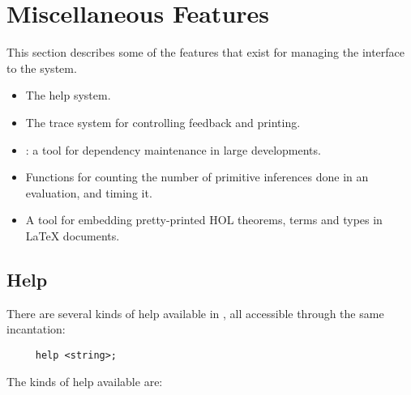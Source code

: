 \chapter{Miscellaneous Features}\label{avramisc}

This section describes some of the features
that exist for managing the interface
%
%
to the \HOL{} system.

\begin{itemize}
\item The help system.
\item The trace system for controlling feedback and printing.
\item \holmake{}: a tool for dependency maintenance in large developments.
\item Functions for counting the number of primitive inferences done in
an evaluation, and timing it.
\item A tool for embedding pretty-printed HOL theorems, terms and
  types in \LaTeX{} documents.
\end{itemize}

\section{Help}

 There are several kinds of help available in \HOL{}, all accessible
 through the same incantation:
 \begin{verbatim}
     help <string>;
 \end{verbatim}

 The kinds of help available are:

